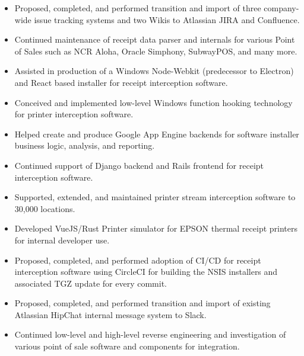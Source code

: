 \documentclass[10pt,letter,ragged2e]{altacv}
\begin{document}
\begin{paracol}{2}
\begin{itemize}
\item Proposed, completed, and performed transition and import of three company-wide issue tracking systems and two Wikis to Atlassian JIRA and Confluence.
\item Continued maintenance of receipt data parser and internals for various Point of Sales such as NCR Aloha, Oracle Simphony, SubwayPOS, and many more.
\item Assisted in production of a Windows Node-Webkit (predecessor to Electron) and React based installer for receipt interception software.
\item Conceived and implemented low-level Windows function hooking technology for printer interception software.
\item Helped create and produce Google App Engine backends for software installer business logic, analysis, and reporting.
\item Continued support of Django backend and Rails frontend for receipt interception software.
\item Supported, extended, and maintained printer stream interception software to 30,000 locations.
\item Developed VueJS/Rust Printer simulator for EPSON thermal receipt printers for internal developer use.
\item Proposed, completed, and performed adoption of CI/CD for receipt interception software using CircleCI for building the NSIS installers and associated TGZ update for every commit.
\item Proposed, completed, and performed transition and import of existing Atlassian HipChat internal message system to Slack.
\item Continued low-level and high-level reverse engineering and investigation of various point of sale software and components for integration.
\end{itemize}

\divider


\end{paracol}
\end{document}
